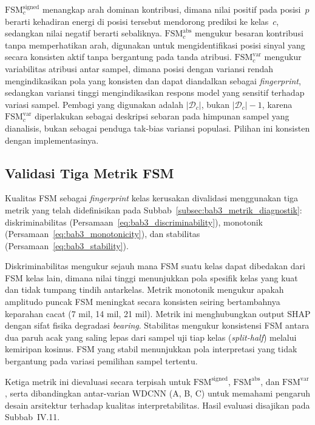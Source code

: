 $\text{FSM}_c^{\text{signed}}$ menangkap arah dominan kontribusi, dimana nilai positif
pada posisi~$p$ berarti kehadiran energi di posisi tersebut mendorong
prediksi ke kelas~$c$, sedangkan nilai negatif berarti sebaliknya.
$\text{FSM}_c^{\text{abs}}$ mengukur besaran kontribusi tanpa memperhatikan
arah, digunakan untuk mengidentifikasi posisi sinyal yang secara konsisten
aktif tanpa bergantung pada tanda atribusi.
$\text{FSM}_c^{\text{var}}$ mengukur variabilitas atribusi antar sampel, dimana
posisi dengan variansi rendah mengindikasikan pola yang konsisten dan dapat
diandalkan sebagai \emph{fingerprint}, sedangkan variansi tinggi mengindikasikan
respons model yang sensitif terhadap variasi sampel.
Pembagi yang digunakan adalah $|\mathcal{D}_c|$, bukan $|\mathcal{D}_c| - 1$,
karena $\text{FSM}_c^{\text{var}}$ diperlakukan sebagai deskripsi sebaran pada
himpunan sampel yang dianalisis, bukan sebagai penduga tak-bias variansi
populasi. Pilihan ini konsisten dengan implementasinya.

\subsection{Validasi Tiga Metrik FSM}
\label{subsec:bab4_fsm_validasi}

Kualitas FSM sebagai \emph{fingerprint} kelas kerusakan divalidasi menggunakan
tiga metrik yang telah didefinisikan pada
Subbab~\ref{subsec:bab3_metrik_diagnostik}: diskriminabilitas
(Persamaan~\ref{eq:bab3_discriminability}), monotonik
(Persamaan~\ref{eq:bab3_monotonicity}), dan stabilitas
(Persamaan~\ref{eq:bab3_stability}).

Diskriminabilitas mengukur sejauh mana FSM suatu kelas dapat dibedakan dari
FSM kelas lain, dimana nilai tinggi menunjukkan pola spesifik kelas yang kuat dan
tidak tumpang tindih antarkelas.
Metrik monotonik mengukur apakah amplitudo puncak FSM meningkat secara konsisten
seiring bertambahnya keparahan cacat (7 mil, 14 mil, 21 mil). Metrik ini
menghubungkan output SHAP dengan sifat fisika degradasi \emph{bearing}.
Stabilitas mengukur konsistensi FSM {\color{blue}antara dua paruh acak
yang saling lepas dari sampel uji tiap kelas (\emph{split-half}) melalui
kemiripan kosinus}. FSM yang stabil menunjukkan pola interpretasi yang tidak bergantung pada variasi
{\color{blue}pemilihan sampel} tertentu.

Ketiga metrik ini dievaluasi secara terpisah untuk $\text{FSM}^{\text{signed}}$,
$\text{FSM}^{\text{abs}}$, dan $\text{FSM}^{\text{var}}$, serta dibandingkan
antar-varian WDCNN (A, B, C) untuk memahami pengaruh desain arsitektur
terhadap kualitas interpretabilitas.
Hasil evaluasi disajikan pada Subbab~IV.11.

